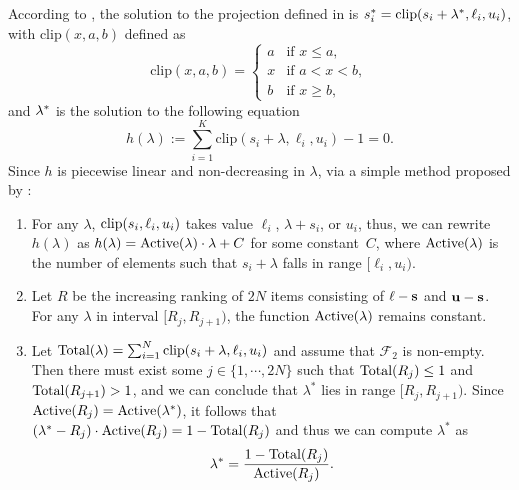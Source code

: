 According to \citet{adam2022projections}, the solution to the projection defined in  is $s_i^* = \text{clip} (s_i + \lambda^{*}, \ell_i, u_i)$, with $\text{clip}(x, a, b)$ defined as
\begin{equation*}
	\text{clip}(x, a, b) = \begin{cases}
		a & \text{if } x \leq a, \\
		x & \text{if } a < x < b, \\
		b & \text{if } x \geq b,
	\end{cases}
\end{equation*}
and $\lambda^{*}$ is the solution to the following equation
\begin{equation*}
	h(\lambda) := \sum_{i=1}^{K} \text{clip}(s_i + \lambda, \ell_i, u_i) -1 = 0.
\end{equation*}
Since $h$ is piecewise linear and non-decreasing in $\lambda$,  via a simple method proposed by \citet{adam2022projections}:
\begin{enumerate}[leftmargin=*]
	\item For any $\lambda$, $\text{clip}(s_i, \ell_i, u_i)$ takes value $\ell_i$, $\lambda + s_i$, or $u_i$, thus, we can rewrite $h(\lambda)$ as $h(\lambda) = \text{Active}(\lambda) \cdot \lambda + C$ for some constant~$C$, where $\text{Active}(\lambda) $ is the number of elements such that $s_i + \lambda$ falls in range $[\ell_i, u_i)$.
	\item Let $R$ be the increasing ranking of $2N$ items consisting of $\mathbf{{\ell}} - \mathbf{{s}}$ and $\mathbf{{u}} - \mathbf{{s}}$. For any $\lambda$ in interval $[R_j, R_{j+1})$, the function $\text{Active}(\lambda)$ remains constant.
	\item Let $\text{Total}(\lambda) = \sum_{i=1}^N \text{clip}(s_i + \lambda, \ell_i, u_i)$ and assume that $\mathcal{F}_2$ is non-empty. Then there must exist some $j \in \{1, \cdots, 2N\}$ such that $\text{Total}(R_j) \leq 1$ and $\text{Total}(R_{j+1}) > 1$, and we can conclude that $\lambda^*$ lies in range $[R_j, R_{j+1})$. Since $\text{Active}(R_j) = \text{Active}(\lambda^*)$, it follows that
	$(\lambda^{*} - R_j) \cdot \text{Active}(R_j) = 1 - \text{Total}(R_j)$
	and thus we can compute $\lambda^{*}$ as 
	\begin{equation*}
		\lambda^{*} = \frac{1-\text{Total}(R_j)}{\text{Active}(R_j)}.
	\end{equation*}
\end{enumerate}





